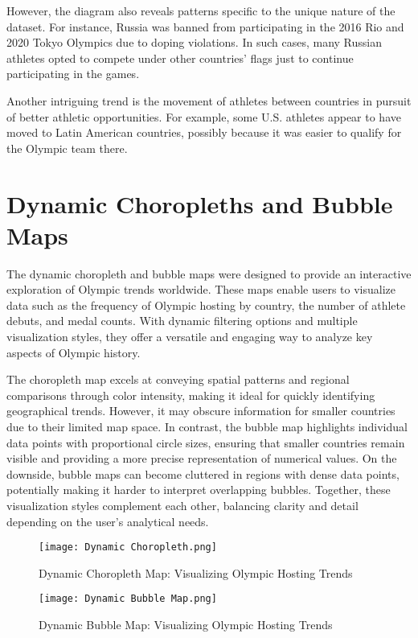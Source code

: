 However, the diagram also reveals patterns specific to the unique nature of the dataset. For instance, Russia was banned from participating in the 2016 Rio and 2020 Tokyo Olympics due to doping violations. In such cases, many Russian athletes opted to compete under other countries' flags just to continue participating in the games.

Another intriguing trend is the movement of athletes between countries in pursuit of better athletic opportunities. For example, some U.S. athletes appear to have moved to Latin American countries, possibly because it was easier to qualify for the Olympic team there. 


\section{Dynamic Choropleths and Bubble Maps}

The dynamic choropleth and bubble maps were designed to provide an interactive exploration of Olympic trends worldwide. These maps enable users to visualize data such as the frequency of Olympic hosting by country, the number of athlete debuts, and medal counts. With dynamic filtering options and multiple visualization styles, they offer a versatile and engaging way to analyze key aspects of Olympic history.

The choropleth map excels at conveying spatial patterns and regional comparisons through color intensity, making it ideal for quickly identifying geographical trends. However, it may obscure information for smaller countries due to their limited map space. In contrast, the bubble map highlights individual data points with proportional circle sizes, ensuring that smaller countries remain visible and providing a more precise representation of numerical values. On the downside, bubble maps can become cluttered in regions with dense data points, potentially making it harder to interpret overlapping bubbles. Together, these visualization styles complement each other, balancing clarity and detail depending on the user's analytical needs.

\begin{figure}[ht]
    \centering
    \texttt{[image: Dynamic Choropleth.png]}
    \caption{Dynamic Choropleth Map: Visualizing Olympic Hosting Trends}
    \label{fig:choropleth_map}
\end{figure}

\begin{figure}[ht]
    \centering
    \texttt{[image: Dynamic Bubble Map.png]}
    \caption{Dynamic Bubble Map: Visualizing Olympic Hosting Trends}
    \label{fig:bubble_map}
\end{figure}

